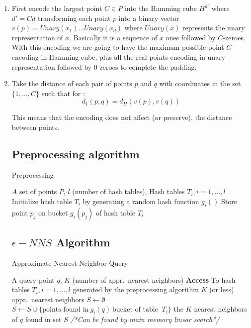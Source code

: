 \documentclass[12pt, a4paper]{article}
\theoremstyle{definition}
\begin{document}
\begin{enumerate}
  \item First encode the largest point $C \in P$ into the Hamming cube $H^{d'}$ where $d' = Cd$ transforming each point $p$ into a binary vector $v(p) = Unary(x_1) \dots Unary(x_d)$ where $Unary(x)$ represents the unary representation of $x$. Basically it is a sequence of $x$ ones followed by $C$-zeroes.
    With this encoding we are going to have the maximum possible point $C$ encoding in Hamming cube, plus all the real points encoding in unary representation followed by $0$-zeroes to complete the padding.
  \item Take the distance of each pair of points $p$ and $q$ with coordinates in the set $\{1,\dots, C\}$ such that for :
    \begin{equation*}
      d_1(p,q) = d_H(v(p), v(q))
    \end{equation*}

    This means that the encoding does not affect (or preserve), the distance between points.

\subsection{Preprocessing algorithm}

    \begin{algorithm}
     \label{alg:preproc}
     \caption{Preprocessing}
     \begin{algorithmic}
     \REQUIRE $A$ set of points $P$,
     \STATE $l$ (number of hash tables),
     \ENSURE Hash tables $T_i, i = 1, \dots ,l$
      \STATE Initialize hash table $T_i$ by generating
      a random hash function $g_i()$
     \ENDFOR
         \STATE Store point $p_j$ on bucket $g_i(p_j)$ of hash table $T_i$
       \ENDFOR
     \ENDFOR
   \end{algorithmic}
   \end{algorithm}

\subsection{$\epsilon-NNS$ Algorithm}

\begin{algorithm}
  \label{algo:nns}
  \caption{Approximate Nearest Neighbor Query}
  \begin{algorithmic}
  \REQUIRE A query point $q$,
  \STATE $K$ (number of appr.\ nearest neighbors)
  \STATE \textbf{Access} To hash tables $T_i, i = 1, \dots, l$ generated by the preprocessing algorithm
  \ENSURE $K$ (or less) appr.\ nearest neighbors
  \STATE $S \leftarrow \emptyset$
    \STATE $S \leftarrow S \cup \{ \text{points found in}\ g_i(q)\ \text{bucket of table }\ T_i\}$
  \ENDFOR
  \RETURN the $K$ nearest neighbors of $q$ found in set $S$
  \STATE \textit{/*Can be found by main memory linear search*/}
  \end{algorithmic}
\end{algorithm}

\end{enumerate}
\end{document}

